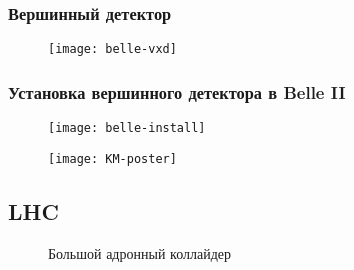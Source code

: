 \begin{frame}
    \frametitle{Вершинный детектор}
    \begin{figure}
        \begin{centering}
            \texttt{[image: belle-vxd]}
        \end{centering}
    \end{figure}
\end{frame}
\begin{frame}
    \frametitle{Установка вершинного детектора в Belle II}
    \begin{figure}
        \begin{centering}
            \texttt{[image: belle-install]}
        \end{centering}
    \end{figure}
\end{frame}
	
\begin{frame}
    \begin{figure}
        \begin{centering}
            \texttt{[image: KM-poster]}
        \end{centering}
    \end{figure}
\end{frame}

\subsection{LHC}
\begin{frame}
    \begin{figure}
        \begin{centering}
    {\LARGE Большой адронный коллайдер}
        \end{centering}
    \end{figure}
\end{frame}

